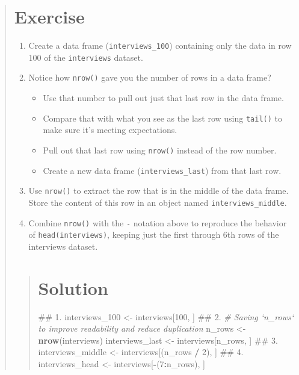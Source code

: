\documentclass[]{book}
\newenvironment{Shaded}{\begin{snugshade}}{\end{snugshade}}
\newcommand{\KeywordTok}[1]{\textcolor[rgb]{0.13,0.29,0.53}{\textbf{#1}}}
\newcommand{\DecValTok}[1]{\textcolor[rgb]{0.00,0.00,0.81}{#1}}
\newcommand{\StringTok}[1]{\textcolor[rgb]{0.31,0.60,0.02}{#1}}
\newcommand{\CommentTok}[1]{\textcolor[rgb]{0.56,0.35,0.01}{\textit{#1}}}
\newcommand{\OperatorTok}[1]{\textcolor[rgb]{0.81,0.36,0.00}{\textbf{#1}}}
\newcommand{\NormalTok}[1]{#1}
\providecommand{\tightlist}{%
  \setlength{\itemsep}{0pt}\setlength{\parskip}{0pt}}
\begin{document}
\begin{quote}
\section{Exercise}\label{exercise-10}

\begin{enumerate}
\def\labelenumi{\arabic{enumi}.}
\item
  Create a data frame (\texttt{interviews\_100}) containing only the
  data in row 100 of the \texttt{interviews} dataset.
\item
  Notice how \texttt{nrow()} gave you the number of rows in a data
  frame?

  \begin{itemize}
  \tightlist
  \item
    Use that number to pull out just that last row in the data frame.
  \item
    Compare that with what you see as the last row using \texttt{tail()}
    to make sure it's meeting expectations.
  \item
    Pull out that last row using \texttt{nrow()} instead of the row
    number.
  \item
    Create a new data frame (\texttt{interviews\_last}) from that last
    row.
  \end{itemize}
\item
  Use \texttt{nrow()} to extract the row that is in the middle of the
  data frame. Store the content of this row in an object named
  \texttt{interviews\_middle}.
\item
  Combine \texttt{nrow()} with the \texttt{-} notation above to
  reproduce the behavior of \texttt{head(interviews)}, keeping just the
  first through 6th rows of the interviews dataset.
\end{enumerate}

\begin{quote}
\section{Solution}\label{solution-12}

\begin{Shaded}
\begin{Highlighting}[]
\NormalTok{## 1.}
\NormalTok{interviews_}\DecValTok{100}\NormalTok{ <-}\StringTok{ }\NormalTok{interviews[}\DecValTok{100}\NormalTok{, ]}
\NormalTok{## 2.}
\CommentTok{# Saving `n_rows` to improve readability and reduce duplication}
\NormalTok{n_rows <-}\StringTok{ }\KeywordTok{nrow}\NormalTok{(interviews)}
\NormalTok{interviews_last <-}\StringTok{ }\NormalTok{interviews[n_rows, ]}
\NormalTok{## 3.}
\NormalTok{interviews_middle <-}\StringTok{ }\NormalTok{interviews[(n_rows }\OperatorTok{/}\StringTok{ }\DecValTok{2}\NormalTok{), ]}
\NormalTok{## 4.}
\NormalTok{interviews_head <-}\StringTok{ }\NormalTok{interviews[}\OperatorTok{-}\NormalTok{(}\DecValTok{7}\OperatorTok{:}\NormalTok{n_rows), ]}
\end{Highlighting}
\end{Shaded}
\end{quote}
\end{quote}
\end{document}
